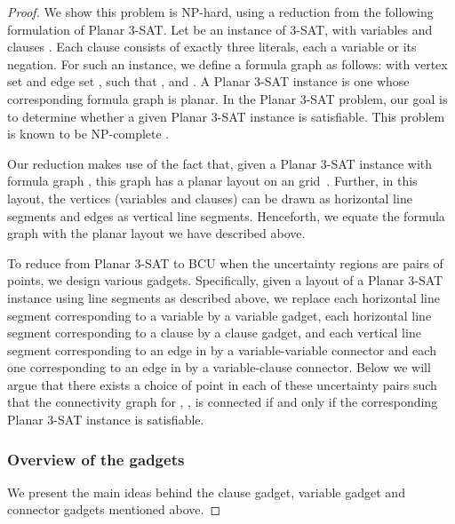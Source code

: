 \begin{proof}  We show this problem is NP-hard, using a reduction from the following formulation of Planar 3-SAT. Let  be an instance of 3-SAT, with variables  and clauses .  Each clause consists of exactly three literals, each a variable or its negation.  For such an instance, we define a formula graph  as follows:  with vertex set  and edge set , such that , and . A Planar 3-SAT instance is one whose corresponding formula graph  is planar. In the Planar 3-SAT problem, our goal is to determine whether a given Planar 3-SAT instance  is satisfiable. This problem is known to be NP-complete \cite{Garey_Johnson79,Lichtenstein}.

Our reduction makes use of the fact that, given a Planar 3-SAT instance  with formula graph , this graph has a planar layout on an  grid~\cite{Duchet,Rosenstiehl}.  Further, in this layout, the vertices (variables and clauses) can be drawn as horizontal line segments and edges as vertical line segments.  Henceforth, we equate the formula graph  with the planar layout we have described above.

To reduce from Planar 3-SAT to  BCU when the uncertainty regions are pairs of points, we design various gadgets.  Specifically, given a layout of a Planar 3-SAT instance using line segments as described above, we replace each horizontal line segment corresponding to a variable by a variable gadget, each horizontal line segment corresponding to a clause by a clause gadget, and each vertical line segment corresponding to an edge in  by a variable-variable connector and each one corresponding to an edge in  by a variable-clause connector.  Below we will argue that there exists a choice of point in each of these uncertainty pairs such that the connectivity graph for , , is connected if and only if the corresponding Planar 3-SAT instance is satisfiable.


\subsubsection*{Overview of the gadgets}
We  present the main ideas behind the clause gadget, variable gadget and connector gadgets mentioned above.


\end{proof}
